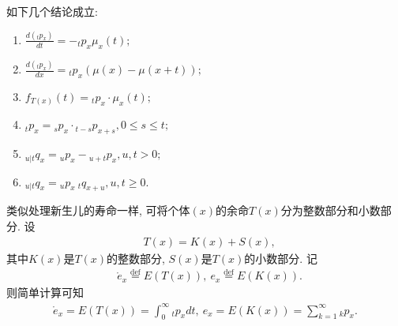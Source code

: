 \documentclass[lang=cn,10pt]{elegantbook}
\begin{document}
\begin{corollary}
    如下几个结论成立:
    \begin{enumerate}
        \item $\frac{d(_tp_x)}{dt}=-_tp_x\mu_x(t);$
        \item $\frac{d(_tp_x)}{dx}= {}_tp_x(\mu(x)-\mu(x+t));$
        \item $f_{T(x)}(t)={}_tp_x\cdot \mu_x(t);$
        \item $_tp_x={}_sp_x\cdot{}_{t-s}p_{x+s},0\leq s\leq t;$
        \item ${}_{u|t}q_x={}_up_x-{}_{u+t}p_x, u,t>0;$
        \item ${}_{u|t}q_x={}_up_x~{}_{t}q_{x+u},u,t\ge0.$
    \end{enumerate}
\end{corollary}

\begin{definition}[个体$(x)$的整数与分数余命及期望]
    类似处理新生儿的寿命一样, 可将个体$(x)$的余命$T(x)$分为整数部分和小数部分.
    设
    \begin{align*}
         & T(x)=K(x)+S(x),
    \end{align*}
    其中$K(x)$是$T(x)$的整数部分, $S(x)$是$T(x)$的小数部分. 记
    \begin{align*}
         & \mathring{e}_x\stackrel{\text{def}}{=}E(T(x)), \   {e_x}\stackrel{\text{def}}{=}E(K(x)).
    \end{align*}
    则简单计算可知 \begin{align*}
        \mathring{e}_x =E(T(x))=\int_{0}^{\infty}{_tp_xdt}, ~
        {e_x}          =E(K(x))=\sum_{k=1}^{\infty}{_kp_x}.
    \end{align*}
\end{definition}
\end{document}
